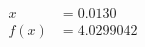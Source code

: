 \documentclass[preview]{standalone}
\begin{document}
\begin{align*}
x &= 0.0130\\f(x) &= 4.0299042
\end{align*}
\end{document}

